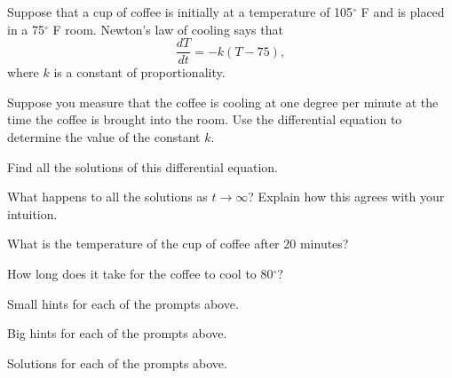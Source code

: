 \begin{activity} \label{A:7.4.2}  
  Suppose that a cup of coffee is initially at a temperature of
  105$^\circ$ F and is placed in a 75$^\circ$ F room.  Newton's law of
  cooling says that 
  $$
  \frac{dT}{dt} = -k(T-75),
  $$ 
  where $k$ is a constant of proportionality.

\ba
\item Suppose you measure that the coffee is cooling at one degree per
  minute at the time the coffee is brought into the room.  Use the
  differential equation to determine the value of the constant $k$.

\item Find all the solutions of this differential equation.

\item What happens to all the solutions as $t\to\infty$?  Explain how
  this agrees with your intuition.

\item What is the temperature of the cup of coffee after 20 minutes?

\item How long does it take for the coffee to cool to 80$^\circ$?

\ea
\end{activity}
\begin{smallhint}
\ba
	\item Small hints for each of the prompts above.
\ea
\end{smallhint}
\begin{bighint}
\ba
	\item Big hints for each of the prompts above.
\ea
\end{bighint}
\begin{activitySolution}
\ba
	\item Solutions for each of the prompts above.
\ea
\end{activitySolution}
\aftera